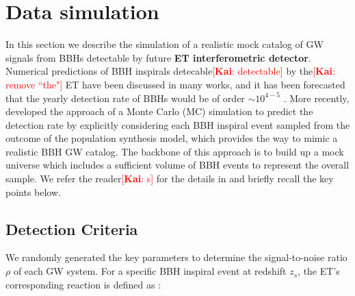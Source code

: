 \documentclass[twocolumn]{aastex62}
\newcommand{\kai}[1]{\textcolor{red}{[{\bf Kai}: #1]}}
\begin{document}
\section{Data simulation} \label{sec_simulation}
In this section we describe the simulation of a realistic mock catalog of GW signals from BBHs detectable by future \textbf{ET interferometric detector}. Numerical predictions of BBH inspirals detecable\kai{detectable} by the\kai{remove ``the"} ET 
have been discussed in many works, and it has been forecasted that the yearly detection rate of BBHs would be of order $\sim10^{4-5}$ \citep{Abernathy2011, Ola2013, Biesiada2014}. More recently, \citet{Yang2019} developed the approach of a Monte Carlo (MC) simulation to predict the detection rate by explicitly considering each BBH inspiral event sampled from the outcome of the population synthesis model, which provides the way to mimic a realistic BBH GW catalog. The backbone of this approach is to build up a mock universe which includes a sufficient volume of BBH events to represent the overall sample. We refer the reader\kai{s} for the details in \citet[][Section 2, therein]{Yang2019}  and briefly recall the key points below.

\subsection{Detection Criteria} \label{subsec_criteria}
We randomly generated the key parameters to determine the signal-to-noise ratio $\rho$ of each GW system. For a specific BBH inspiral event at redshift $z_s$, the ET's corresponding reaction is defined as \citep{Abernathy2011}:
\end{document}
